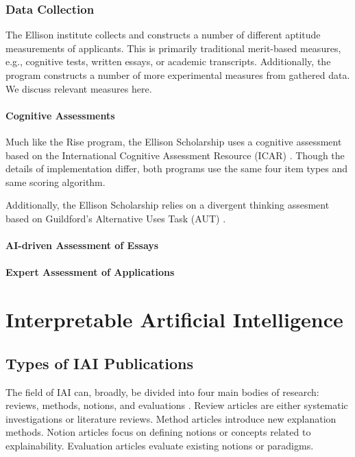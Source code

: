 \subsubsection{Data Collection}
The Ellison institute collects and constructs a number of different aptitude measurements of applicants. This is primarily traditional merit-based measures, e.g., cognitive tests, written essays, or academic transcripts. Additionally, the program constructs a number of more experimental measures from gathered data. We discuss relevant measures here.

\paragraph{Cognitive Assessments} 
Much like the Rise program, the Ellison Scholarship uses a cognitive assessment based on the International Cognitive Assessment Resource (ICAR) \cite{condon2014international, subotic2020psychometric}. Though the details of implementation differ, both programs use the same four item types and same scoring algorithm.

Additionally, the Ellison Scholarship relies on a divergent thinking assesment based on Guildford's Alternative Uses Task (AUT) \cite{}. %

\paragraph{AI-driven Assessment of Essays}

\paragraph{Expert Assessment of Applications}



\section{Interpretable Artificial Intelligence}
\subsection{Types of IAI Publications}

The field of IAI can, broadly, be divided into four main bodies of research: reviews, methods, notions, and evaluations \cite{vilone_explainable_2020}. Review articles are either systematic investigations or literature reviews. Method articles introduce new explanation methods. Notion articles focus on defining notions or concepts related to explainability. Evaluation articles evaluate existing notions or paradigms.

